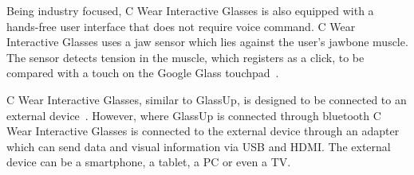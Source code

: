 Being industry focused, C Wear Interactive Glasses is also equipped with a hands-free user interface  that does not require voice command. C Wear Interactive Glasses uses a jaw sensor which lies against the user's jawbone muscle. The sensor detects tension in the muscle, which registers as a click, to be compared with a touch on the Google Glass touchpad~\cite{pennyProducts}.

C Wear Interactive Glasses, similar to GlassUp, is designed to be connected to an external device~\cite{pennyProducts}. However, where GlassUp is connected through bluetooth C Wear Interactive Glasses is connected to the external device through an adapter which can send data and visual information via USB and HDMI. The external device can be a smartphone, a tablet, a PC or even a TV.
